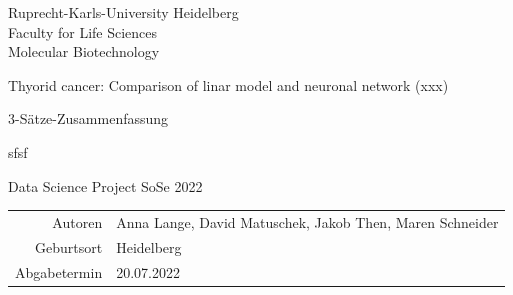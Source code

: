 \documentclass[
  parskip,
  oneside]{scrreprt}
\author{}
\date{\vspace{-2.5em}}
\begin{document}
\begin{titlepage}
\centering
    {\Large Ruprecht-Karls-University Heidelberg\\
        Faculty for Life Sciences\\
        Molecular Biotechnology\\}

    {}
    {

        {\Huge Thyorid cancer: Comparison of linar model and neuronal network (xxx)}

        {\Huge 3-Sätze-Zusammenfassung}

        {\Huge sfsf}

    }

    {\Large Data Science Project SoSe 2022}


    {\Large
        \begin{tabular}{rl}
            Autoren & Anna Lange, David Matuschek, Jakob Then, Maren Schneider\\
            Geburtsort & Heidelberg\\
            Abgabetermin &20.07.2022\\
        \end{tabular}
    }


\end{titlepage}

\tableofcontents
\end{document}
